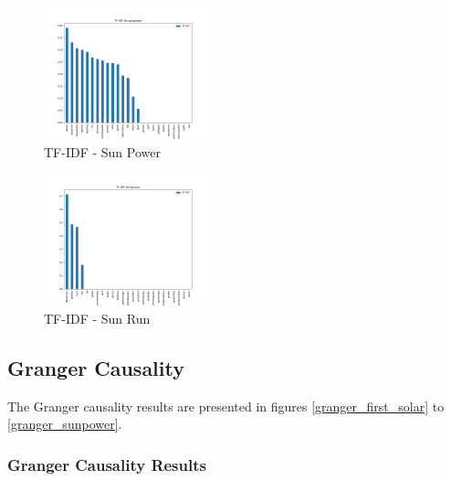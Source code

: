 \documentclass[sigconf, nonacm]{acmart}
\begin{document}
\begin{figure}[H]
  \centering
  \includegraphics[width=\linewidth, height =1.5in]{sunpowertfidf.png}
  \caption{TF-IDF - Sun Power}
\end{figure}
\begin{figure}[H]
  \centering
  \includegraphics[width=\linewidth, height =1.5in]{sunruntfidf.png}
  \caption{TF-IDF - Sun Run}
\end{figure}



\subsection{Granger Causality} 
The Granger causality results are presented in figures \ref{granger_first_solar} to \ref{granger_sunpower}. 


\subsubsection{Granger Causality Results}
\end{document}
